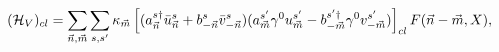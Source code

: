 \begin{equation}
\label{hamiltonianV}
({\cal H}_V)_{cl} =
\sum_{{\vec n},{\vec m}} 
\sum_{s,s'} \kappa_{\vec m} 
\left[(a^{s\dagger}_{\vec n} \bar{u}^s_{\vec n} +
b^{s}_{-{\vec n}} \bar{v}^s_{-{\vec n}})
(a^{s'}_{\vec m} \gamma^0 u^{s'}_{\vec m} -
b^{s'\dagger}_{-{\vec m}} \gamma^0 v^{s'}_{-{\vec m}})\right]_{cl}
F({\vec n}-{\vec m},X),
\end{equation}

